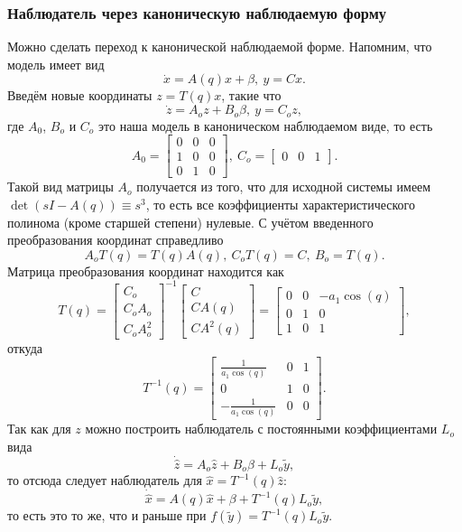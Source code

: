 \documentclass{article}
\begin{document}
\subsubsection{Наблюдатель через каноническую наблюдаемую форму}
Можно сделать переход к канонической наблюдаемой форме. Напомним, что модель имеет вид
\[
	\dot{x} = A(q)x + \beta, \ y=Cx.
\]
Введём новые координаты $z=T(q)x$, такие что
\[
	\dot{z} = A_oz + B_o\beta, \ y=C_oz,
\]
где $A_0$, $B_o$ и $C_o$ это наша модель в каноническом наблюдаемом виде, то есть
\[
	A_0 = \begin{bmatrix} 0 & 0  & 0\\ 1 & 0 & 0 \\ 0 & 1 & 0 \end{bmatrix}, \ C_o = \begin{bmatrix} 0 & 0 & 1 \end{bmatrix}.
\]
Такой вид матрицы $A_o$ получается из того, что для исходной системы имеем $\det\left(sI-A(q)\right) \equiv s^3$, то есть все  коэффициенты характеристического полинома (кроме старшей степени) нулевые. С учётом введенного преобразования координат справедливо 
\[
	A_oT(q) = T(q) A(q), \ C_oT(q) = C, \ B_o=T(q).
\]
Матрица преобразования координат находится как
\[
	T(q) = \begin{bmatrix} C_o \\ C_oA_o \\ C_oA_o^2 \end{bmatrix}^{-1}\begin{bmatrix} C \\ CA(q) \\ CA^2(q) \end{bmatrix} 
		= \begin{bmatrix} 0 & 0 & -a_1\cos(q) \\ 0 & 1 & 0 \\ 1 & 0 & 1 \end{bmatrix},
\]
откуда 
\[
	T^{-1}(q) = \begin{bmatrix} \frac{1}{a_1\cos(q)} & 0 & 1 \\ 0 & 1 & 0 \\ -\frac{1}{a_1\cos(q)} & 0 & 0\end{bmatrix}.
\]
Так как для $z$ можно построить наблюдатель с постоянными коэффициентами $L_o$ вида 
\[
	\dot{\hat{z}} = A_o\hat{z} + B_o\beta + L_o\tilde{y},
\]
то отсюда следует наблюдатель для $\hat{x} = T^{-1}(q)\hat{z}$:
\[
	\dot{\hat{x}} = A(q)\hat{x} + \beta + T^{-1}(q)L_o\tilde{y},
\]
то есть это то же, что и раньше при $f(\tilde{y}) = T^{-1}(q)L_o\tilde{y}$. 
\end{document}
